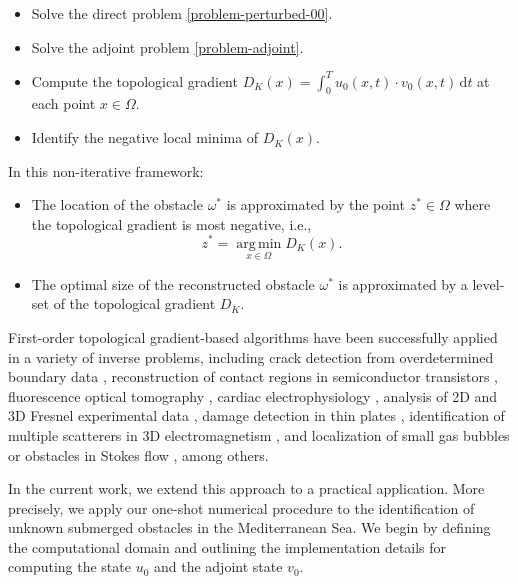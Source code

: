 \documentclass[a4paper,12pt,reqno,natbib]{amsart}
\begin{document}
\vspace{0.3cm}

\begin{algorithm}[H]
\caption{One-Iteration Topological Identification Algorithm}
\label{alg:one-shot}
\begin{itemize}
    \item Solve the direct problem \eqref{problem-perturbed-00}.
    \item Solve the adjoint problem \eqref{problem-adjoint}.
    \item Compute the topological gradient \( D_K(x)=\displaystyle\int_0^T u_0(x,t) \cdot v_0(x,t) \, \mathrm{d}t \) at each point \( x \in \Omega \).
    \item Identify the negative local minima of \( D_K(x) \).
\end{itemize}
\end{algorithm}

\vspace{0.2cm}

\noindent In this non-iterative framework:
\begin{itemize}
    \item The location of the obstacle \( \omega^* \) is approximated by the point \( z^* \in \Omega \) where the topological gradient is most negative, i.e.,
    \[
    z^* = \operatorname*{arg\,min}_{x \in \Omega} D_K(x).
    \]
    \item The optimal size of the reconstructed obstacle \( \omega^* \) is approximated by a level-set of the topological gradient \( D_K \).
\end{itemize}

First-order topological gradient-based algorithms have been successfully applied in a variety of inverse problems, including crack detection from overdetermined boundary data \cite{AmstutzCC2005}, reconstruction of contact regions in semiconductor transistors \cite{hrizi2019reconstruction}, fluorescence optical tomography \cite{LaurainIP2013}, cardiac electrophysiology \cite{beretta2017reconstruction,BerettaIP2017}, analysis of 2D and 3D Fresnel experimental data \cite{carpio2021processing}, damage detection in thin plates \cite{pena2019detecting}, identification of multiple scatterers in 3D electromagnetism \cite{le2017topological1,le2018topological1}, and localization of small gas bubbles or obstacles in Stokes flow \cite{BenAbdaSIAM2009,CaubetIP2012}, among others.

In the current work, we extend this approach to a practical application. More precisely, we apply our one-shot numerical procedure to the identification of unknown submerged obstacles in the Mediterranean Sea. We begin by defining the computational domain and outlining the implementation details for computing the state \( u_0 \) and the adjoint state \( v_0 \).
\end{document}
